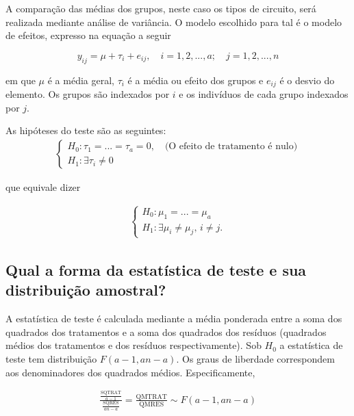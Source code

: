 \documentclass[
]{article}
\begin{document}
A comparação das médias dos grupos, neste caso os tipos de circuito,
será realizada mediante análise de variância. O modelo escolhido para
tal é o modelo de efeitos, expresso na equação a seguir

\begin{equation}
  y_{ij} = \mu + \tau_i + e_{ij}, \quad i = 1, 2,..., a; \quad j = 1, 2,..., n 
\end{equation}

em que \(\mu\) é a média geral, \(\tau_i\) é a média ou efeito dos
grupos e \(e_{ij}\) é o desvio do elemento. Os grupos são indexados por
\(i\) e os indivíduos de cada grupo indexados por \(j\).

As hipóteses do teste são as seguintes: \begin{align}
  \begin{cases}
    H_0: \tau_1 = ... = \tau_a = 0, \quad \text{(O efeito de tratamento é nulo)}\\
    H_1: \exists \tau_i \neq 0
  \end{cases}
\end{align}

que equivale dizer

\begin{align}
  \begin{cases}
    H_0: \mu_1 = ... = \mu_a\\
    H_1: \exists \mu_i \neq \mu_j, \, i \neq j.
  \end{cases}
\end{align}

\hypertarget{qual-a-forma-da-estatuxedstica-de-teste-e-sua-distribuiuxe7uxe3o-amostral}{%
\subsection{Qual a forma da estatística de teste e sua distribuição
amostral?}\label{qual-a-forma-da-estatuxedstica-de-teste-e-sua-distribuiuxe7uxe3o-amostral}}

A estatística de teste é calculada mediante a média ponderada entre a
soma dos quadrados dos tratamentos e a soma dos quadrados dos resíduos
(quadrados médios dos tratamentos e dos resíduos respectivamente). Sob
\(H_0\) a estatística de teste tem distribuição \(F(a-1, an-a)\). Os
graus de liberdade correspondem aos denominadores dos quadrados médios.
Especificamente,

\begin{align}
  \frac{\frac{\text{SQTRAT}}{a-1}}{\frac{\text{SQRES}}{an-a}} = \frac{\text{QMTRAT}}{\text{QMRES}} \sim F(a-1, an-a)
\end{align}
\end{document}
